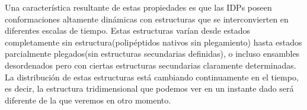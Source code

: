 




Una característica resultante de estas propiedades es que las IDPs poseen conformaciones altamente dinámicas con estructuras que se interconvierten en diferentes escalas de tiempo. 
Estas estructuras varían desde estados completamente sin estructura(polipéptidos nativos sin plegamiento) hasta estados parcialmente plegados(sin estructuras secundarias definidas), o incluso ensambles desordenados pero con ciertas
estructuras secundarias claramente determinadas.
La distribución de estas estructuras está cambiando continuamente en el tiempo, es decir, la estructura tridimensional que podemos ver en un instante dado será diferente de la que veremos en otro momento.



